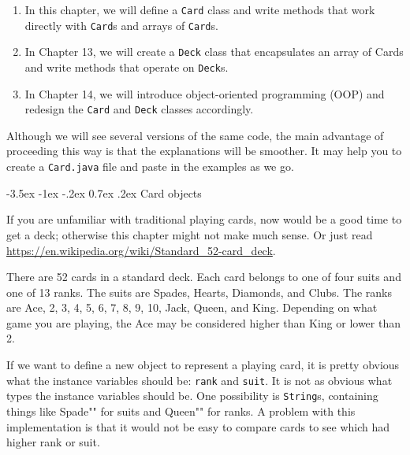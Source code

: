 \documentclass[12pt]{book}
\makeatletter
\theoremstyle{exercise}
\newcommand{\java}[1]{\verb"#1"}
\renewcommand{\section}{\@startsection{section}{1}{\z@}%
    {-3.5ex \@plus -1ex \@minus -.2ex}%
    {0.7ex \@plus.2ex}%
    {\normalfont\Large\bfseries}}
\newcommand{\java}[1]{\lstinline{#1}} %
\makeatother
\begin{document}
\begin{enumerate}

\item In this chapter, we will define a \java{Card} class and write methods that work directly with \java{Card}s and arrays of \java{Card}s.


\item In Chapter 13, we will create a \java{Deck} class that encapsulates an array of Cards and write methods that operate on \java{Deck}s.

\item In Chapter 14, we will introduce object-oriented programming (OOP) and redesign the \java{Card} and \java{Deck} classes accordingly.

\end{enumerate}

Although we will see several versions of the same code, the main advantage of proceeding this way is that the explanations will be smoother.
It may help you to create a {\tt Card.java} file and paste in the examples as we go.



\section{Card objects}
\label{card}


If you are unfamiliar with traditional playing cards, now would be a good time to get a deck; otherwise this chapter might not make much sense.
Or just read \url{https://en.wikipedia.org/wiki/Standard_52-card_deck}.


There are 52 cards in a standard deck.
Each card belongs to one of four suits and one of 13 ranks.
The suits are Spades, Hearts, Diamonds, and Clubs.
The ranks are Ace, 2, 3, 4, 5, 6, 7, 8, 9, 10, Jack, Queen, and King.
Depending on what game you are playing, the Ace may be considered higher than King or lower than 2.

If we want to define a new object to represent a playing card, it is pretty obvious what the instance variables should be: \java{rank} and \java{suit}.
It is not as obvious what types the instance variables should be.
One possibility is \java{String}s, containing things like \java{"Spade"} for suits and \java{"Queen"} for ranks.
A problem with this implementation is that it would not be easy to compare cards to see which had higher rank or suit.
\end{document}
